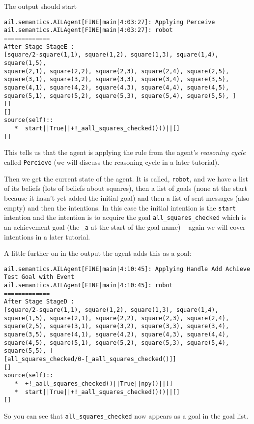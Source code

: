 The output should start
\begin{verbatim}
ail.semantics.AILAgent[FINE|main|4:03:27]: Applying Perceive 
ail.semantics.AILAgent[FINE|main|4:03:27]: robot
=============
After Stage StageE :
[square/2-square(1,1), square(1,2), square(1,3), square(1,4), square(1,5), 
square(2,1), square(2,2), square(2,3), square(2,4), square(2,5), 
square(3,1), square(3,2), square(3,3), square(3,4), square(3,5), 
square(4,1), square(4,2), square(4,3), square(4,4), square(4,5), 
square(5,1), square(5,2), square(5,3), square(5,4), square(5,5), ]
[]
[]
source(self):: 
   *  start||True||+!_aall_squares_checked()()||[]
[] 
\end{verbatim}
This tells us that the agent is applying the rule from the agent's \emph{reasoning cycle} called \texttt{Percieve} (we will discuss the reasoning cycle in a later tutorial).

Then we get the current state of the agent.  It is called, \texttt{robot}, and we have a list of its beliefs (lots of beliefs about squares), then a list of goals (none at the start because it hasn't yet added the initial goal) and then a list of sent messages (also empty) and then the intentions.  In this case the initial intention is the \texttt{start} intention and the intention is to acquire the goal \texttt{all\_squares\_checked} which is an achievement goal (the \texttt{\_a} at the start of the goal name) -- again we will cover intentions in a later tutorial.

A little further on in the output the agent adds this as a goal:
\begin{verbatim}
ail.semantics.AILAgent[FINE|main|4:10:45]: Applying Handle Add Achieve Test Goal with Event 
ail.semantics.AILAgent[FINE|main|4:10:45]: robot
=============
After Stage StageD :
[square/2-square(1,1), square(1,2), square(1,3), square(1,4), square(1,5), square(2,1), square(2,2), square(2,3), square(2,4), square(2,5), square(3,1), square(3,2), square(3,3), square(3,4), square(3,5), square(4,1), square(4,2), square(4,3), square(4,4), square(4,5), square(5,1), square(5,2), square(5,3), square(5,4), square(5,5), ]
[all_squares_checked/0-[_aall_squares_checked()]]
[]
source(self):: 
   *  +!_aall_squares_checked()||True||npy()||[]
   *  start||True||+!_aall_squares_checked()()||[]
[] 
\end{verbatim}
So you can see that \texttt{all\_squares\_checked} now appears as a goal in the goal list. 

